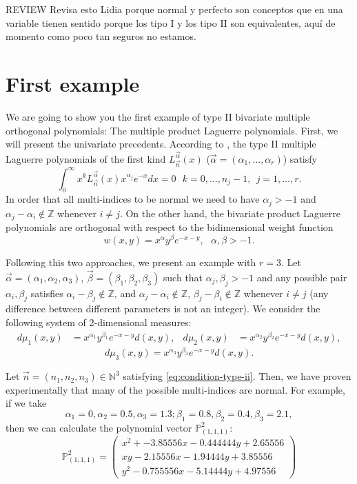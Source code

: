 \documentclass[12pt,a4]{article}
\theoremstyle{plain}
\newcommand{\N}[0]{\mathbb{N}}
\newcommand{\Z}[0]{\mathbb{Z}}
\newcommand{\cb}[1]{{\color{blue}#1}}
\begin{document}
\cb{REVIEW Revisa esto Lidia porque normal y perfecto son conceptos que en una variable tienen sentido porque los tipo I y los tipo II son equivalentes, aquí de momento como poco tan seguros no estamos.}


\section{First example}

We are going to show you the first example of type II bivariate multiple orthogonal polynomials: The multiple product Laguerre polynomials. First, we will present the univariate precedents. According to \cite[Page 658, Section 3.6.1]{foupouagnigni-2020}, the type II multiple Laguerre polynomials of the first kind $L_{\vec n}^{\vec\alpha}(x)$ ($\vec\alpha=(\alpha_1,\dots,\alpha_r)$) satisfy
\begin{equation}
    \int_0^\infty x^k L_{\vec n}^{\vec\alpha}(x) x^{\alpha_j} e^{-x} dx =0 \ \ \ k=0,\dots, n_j-1, \ \ j=1,\dots,r. 
\end{equation}
In order that all multi-indices to be normal we need to have $\alpha_j>-1$ and $\alpha_j- \alpha_i\not\in\Z$ whenever $i\neq j$. On the other hand, the bivariate product Laguerre polynomials \cite[Ch. II, Section 2.2]{dunkl_xu_2014} are orthogonal with respect to the bidimensional weight function
$$w(x,y)=x^\alpha y^\beta e^{-x-y}, \ \ \ \alpha,\beta>-1.$$ 

Following this two approaches, we present an example with $r=3$. Let $\vec\alpha=(\alpha_1,\alpha_2,\alpha_3)$, $\vec\beta=(\beta_1,\beta_2,\beta_3)$ such that $\alpha_j,\beta_j > -1$ and any possible pair $\alpha_i,\beta_j$ satisfies $\alpha_i-\beta_j\not\in\Z$, and  $\alpha_j- \alpha_i\not\in\Z$, $\beta_j- \beta_i\not\in\Z$ whenever $i\neq j$ (any difference between different parameters is not an integer). We consider the following system of 2-dimensional measures:
\begin{align}
    d\mu_1(x,y) &= x^{\alpha_1} y^{\beta_1} e^{-x-y} d(x,y), & d\mu_2(x,y) &= x^{\alpha_2} y^{\beta_2} e^{-x-y} d(x,y),
\end{align}
$$d\mu_3(x,y) = x^{\alpha_3} y^{\beta_3} e^{-x-y} d(x,y).$$

Let $\vec n=(n_1,n_2,n_3)\in\N^3$ satisfying \eqref{eq:condition-type-ii}. Then, we have proven experimentally that many of the possible multi-indices are normal. For example, if we take $$\alpha_1 = 0, \alpha_2 = 0.5, \alpha_3 = 1.3; \beta_1 = 0.8, \beta_2 = 0.4, \beta_3 = 2.1,$$ then we can calculate the polynomial vector $\mathbb P_{(1,1,1)}^2$:
$$
\mathbb P_{(1,1,1)}^2 = \begin{pmatrix}
    x^2 + - 3.85556 x - 0.444444 y + 2.65556 \\ x y - 2.15556 x - 1.94444 y + 3.85556 \\  y^2 - 0.755556 x - 5.14444 y + 4.97556
\end{pmatrix}
$$
\end{document}

